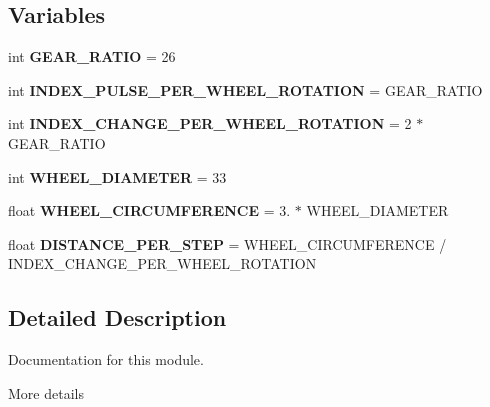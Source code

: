\subsection*{Variables}
\begin{DoxyCompactItemize}
\item 
\mbox{\label{namespacemcs_1_1firmware_1_1AMT103_a3da288509c05beb42781fb95027381f2}} 
int {\bfseries G\+E\+A\+R\+\_\+\+R\+A\+T\+IO} = 26
\item 
\mbox{\label{namespacemcs_1_1firmware_1_1AMT103_af1857d965fae56fde5e95b737ada3554}} 
int {\bfseries I\+N\+D\+E\+X\+\_\+\+P\+U\+L\+S\+E\+\_\+\+P\+E\+R\+\_\+\+W\+H\+E\+E\+L\+\_\+\+R\+O\+T\+A\+T\+I\+ON} = G\+E\+A\+R\+\_\+\+R\+A\+T\+IO
\item 
\mbox{\label{namespacemcs_1_1firmware_1_1AMT103_ae340d6e310d372962993c5b9bbbd12f8}} 
int {\bfseries I\+N\+D\+E\+X\+\_\+\+C\+H\+A\+N\+G\+E\+\_\+\+P\+E\+R\+\_\+\+W\+H\+E\+E\+L\+\_\+\+R\+O\+T\+A\+T\+I\+ON} = 2 $\ast$ G\+E\+A\+R\+\_\+\+R\+A\+T\+IO
\item 
\mbox{\label{namespacemcs_1_1firmware_1_1AMT103_ae5d6eceff3543ec73c283dcb683128ae}} 
int {\bfseries W\+H\+E\+E\+L\+\_\+\+D\+I\+A\+M\+E\+T\+ER} = 33
\item 
\mbox{\label{namespacemcs_1_1firmware_1_1AMT103_af8b222106cf224edd39ea320287ee271}} 
float {\bfseries W\+H\+E\+E\+L\+\_\+\+C\+I\+R\+C\+U\+M\+F\+E\+R\+E\+N\+CE} = 3. $\ast$ W\+H\+E\+E\+L\+\_\+\+D\+I\+A\+M\+E\+T\+ER
\item 
\mbox{\label{namespacemcs_1_1firmware_1_1AMT103_a22976be95136ea71933edd149b3346f3}} 
float {\bfseries D\+I\+S\+T\+A\+N\+C\+E\+\_\+\+P\+E\+R\+\_\+\+S\+T\+EP} = W\+H\+E\+E\+L\+\_\+\+C\+I\+R\+C\+U\+M\+F\+E\+R\+E\+N\+CE / I\+N\+D\+E\+X\+\_\+\+C\+H\+A\+N\+G\+E\+\_\+\+P\+E\+R\+\_\+\+W\+H\+E\+E\+L\+\_\+\+R\+O\+T\+A\+T\+I\+ON
\end{DoxyCompactItemize}


\subsection{Detailed Description}
Documentation for this module. 

More details 